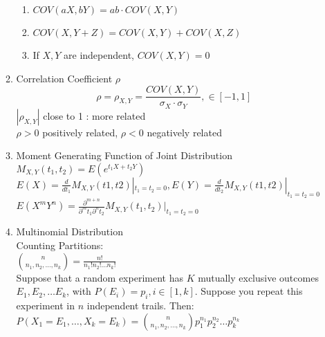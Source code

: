\documentclass[10pt]{article}
\begin{document}
\begin{multicols}{2}
\begin{enumerate}
\begin{enumerate}
\begin{enumerate}
					\item $COV(aX,bY) = ab\cdot COV(X,Y)$
					\item $COV(X,Y+Z) = COV(X,Y) + COV(X,Z)$
					\item If $X, Y$ are independent, $COV(X,Y) = 0$
				\end{enumerate}
				\item Correlation Coefficient $\rho$\\
				$$\rho = \rho_{X,Y}= \frac{COV(X,Y)}{\sigma_X \cdot \sigma_Y}, \in [-1,1]$$
				$|\rho_{X,Y}|$ close to 1 : more related\\
				$\rho > 0$ positively related, $\rho < 0$ negatively related
				\item Moment Generating Function of Joint Distribution
				$M_{X,Y}(t_1, t_2) = E(e^{t_1X + t_2Y})$\\
				$E(X)=\frac{d}{dt_1}M_{X,Y}(t1,t2)|_{t_1=t_2=0}, E(Y) = \frac{d}{dt_2}M_{X,Y}(t1,t2)|_{t_1=t_2=0}$\\
				$E(X^mY^n) = \frac{\partial^{m+n}}{\partial^mt_1\partial^nt_2}M_{X,Y}(t_1, t_2)|_{t_1=t_2=0}$\\
				\item Multinomial Distribution\\
				Counting Partitions:\\
				${n \choose {n_1, n_2, \dots , n_k}} =  \frac{n!}{n_1!n_2! \dots n_k!}$\\
				Suppose that a random experiment has $K$ mutually exclusive outcomes $E_1, E_2, \dots E_k$, with $P(E_i) = p_i , i \in [1,k]$. Suppose you repeat this experiment in $n$ independent trails. Then:\\
				$P(X_1 = E_1, \dots , X_k = E_k) = {n \choose {n_1, n_2, \dots , n_k}}p_1^{n_1}p_2^{n_2} \dots p_k^{n_k}$
			\end{enumerate}
		\end{enumerate}
		\newpage
	\end{multicols}
\end{document}
